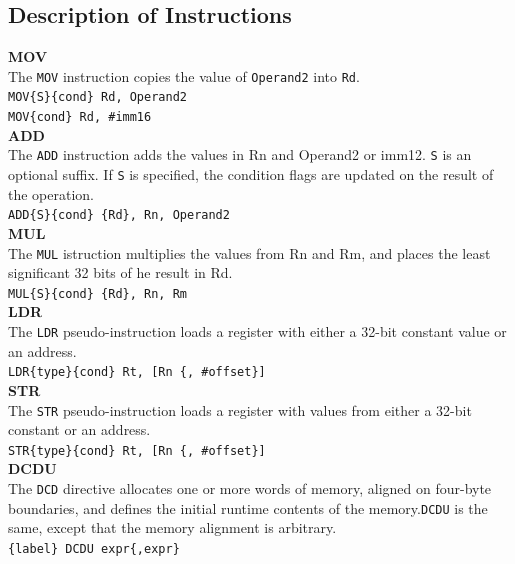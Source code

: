 \documentclass[footheight=20pt, footsepline, headheight=20pt, headsepline]{scrartcl}
\begin{document}
\subsection*{Description of Instructions}
\textbf{MOV}\\The \verb|MOV| instruction copies the value of \verb|Operand2| into \verb|Rd|.\\
\verb|MOV{S}{cond} Rd, Operand2|\\
\verb|MOV{cond} Rd, #imm16|\\
\textbf{ADD}\\
The \verb|ADD| instruction adds the values in Rn and Operand2 or imm12. \verb|S| is an optional suffix. If \verb|S| is specified, the condition flags are updated on the result of the operation.\\
\verb|ADD{S}{cond} {Rd}, Rn, Operand2|\\
\textbf{MUL}\\
The \verb|MUL| istruction multiplies the values from Rn and Rm, and places the least significant 32 bits of he result in Rd.\\
\verb |MUL{S}{cond} {Rd}, Rn, Rm|\\
\textbf{LDR}\\
The \verb|LDR| pseudo-instruction loads a register with either a 32-bit constant value or an address.\\
\verb|LDR{type}{cond} Rt, [Rn {, #offset}]| \\
\textbf{STR}\\
The \verb|STR| pseudo-instruction loads a register with values from either a 32-bit constant or an address.\\
\verb|STR{type}{cond} Rt, [Rn {, #offset}]|\\  
\textbf{DCDU}\\
The \verb|DCD| directive allocates one or more words of memory, aligned on four-byte boundaries, and defines the initial runtime contents of the memory.\verb|DCDU| is the same, except that the memory alignment is arbitrary.\\
\verb|{label} DCDU expr{,expr}|\\


\FloatBarrier
\end{document}
